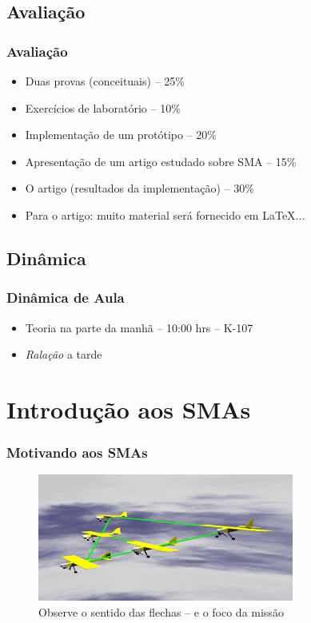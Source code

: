 \documentclass[10pt]{beamer}
\begin{document}
\subsection{Avaliação}
\begin{frame}

    \frametitle{Avaliação}

    \begin{itemize}
      \item Duas provas (conceituais) -- 25\%
      \item Exercícios de laboratório  -- 10\%
      \item Implementação de um protótipo  -- 20\%
      \item Apresentação de um artigo estudado sobre SMA -- 15\%
      \item O artigo (resultados da implementação)  -- 30\%
      \item Para o artigo: muito material será fornecido em \LaTeX ...
       
      
    \end{itemize}
\end{frame}



\subsection{Dinâmica}
\begin{frame}

    \frametitle{Dinâmica de Aula}

    \begin{itemize}
      \item Teoria na parte da manhã -- 10:00 hrs -- K-107
      \item \textit{Ralação} a tarde
      
    \end{itemize}
\end{frame}



\section{Introdução aos SMAs}

\begin{frame}

  \frametitle{Motivando aos SMAs}
    
    
\begin{figure}[!ht]
\centering
\includegraphics[height =.6\textheight,width=.7\textwidth]{figuras/agentes_vizinhos01.jpeg}
\caption{Observe o sentido das flechas --  e  o foco da missão}
\end{figure}
    
    
\end{frame}
\end{document}
